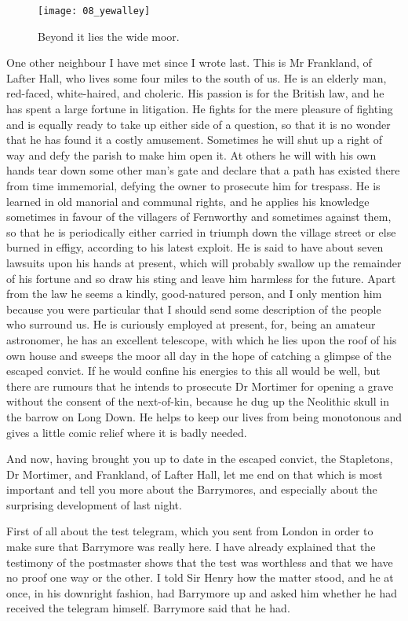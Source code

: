 \documentclass[paper=5.5in:8.5in,BCOR=7mm,twoside,DIV=calc,12pt,usegeometry,openany,chapterprefix,endperiod,headings=big]{scrbook} %
\begin{document}
\begin{figure}[tbh]
\centering
\texttt{[image: 08\_yewalley]}
\caption{Beyond it lies the wide moor.}
\end{figure}

One other neighbour I have met since I wrote last. This is Mr Frankland, of Lafter Hall, who lives some four miles to the south of us. He is an elderly man, red-faced, white-haired, and choleric. His passion is for the British law, and he has spent a large fortune in litigation. He fights for the mere pleasure of fighting and is equally ready to take up either side of a question, so that it is no wonder that he has found it a costly amusement. Sometimes he will shut up a right of way and defy the parish to make him open it. At others he will with his own hands tear down some other man's gate and declare that a path has existed there from time immemorial, defying the owner to prosecute him for trespass. He is learned in old manorial and communal rights, and he applies his knowledge sometimes in favour of the villagers of Fernworthy and sometimes against them, so that he is periodically either carried in triumph down the village street or else burned in effigy, according to his latest exploit. He is said to have about seven lawsuits upon his hands at present, which will probably swallow up the remainder of his fortune and so draw his sting and leave him harmless for the future. Apart from the law he seems a kindly, good-natured person, and I only mention him because you were particular that I should send some description of the people who surround us. He is curiously employed at present, for, being an amateur astronomer, he has an excellent telescope, with which he lies upon the roof of his own house and sweeps the moor all day in the hope of catching a glimpse of the escaped convict. If he would confine his energies to this all would be well, but there are rumours that he intends to prosecute Dr Mortimer for opening a grave without the consent of the next-of-kin, because he dug up the Neolithic skull in the barrow on Long Down. He helps to keep our lives from being monotonous and gives a little comic relief where it is badly needed.

And now, having brought you up to date in the escaped convict, the Stapletons, Dr Mortimer, and Frankland, of Lafter Hall, let me end on that which is most important and tell you more about the Barrymores, and especially about the surprising development of last night.

First of all about the test telegram, which you sent from London in order to make sure that Barrymore was really here. I have already explained that the testimony of the postmaster shows that the test was worthless and that we have no proof one way or the other. I told Sir Henry how the matter stood, and he at once, in his downright fashion, had Barrymore up and asked him whether he had received the telegram himself. Barrymore said that he had.
\end{document}
